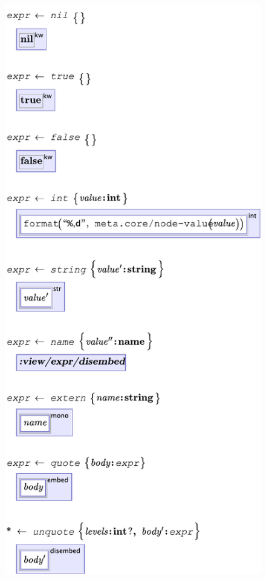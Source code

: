 \begin{figure}
  
  \begin{minipage}[t]{0.48\linewidth}
  \vspace{0pt}  %
  \begin{center}
  \includegraphics[scale=0.65]{src/image/kernel1.pdf}

\end{center}
\end{minipage}
\end{figure}
